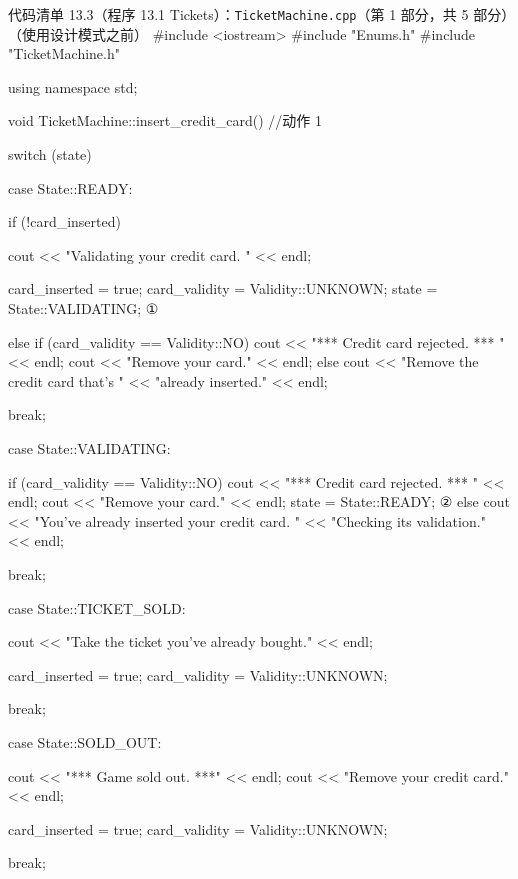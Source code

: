 \begin{codeboxt}{代码清单 13.3（程序 13.1 Tickets）：\texttt{Ticket\allowbreak{}Machine.\allowbreak{}cpp}（第 1 部分，共 5 部分）（使用设计模式之前）}
#include <iostream>
#include "Enums.h"
#include "TicketMachine.h"

using namespace std;

void TicketMachine::insert_credit_card()  //动作 1
{
    switch (state)
    {
        case State::READY:
        {
            if (!card_inserted)
            {
                cout << "Validating your credit card. " << endl;

                card_inserted = true;
                card_validity = Validity::UNKNOWN;
                state = State::VALIDATING;               ①
            }
            else if (card_validity == Validity::NO)
            {
                cout << "*** Credit card rejected. *** " << endl;
                cout << "Remove your card." << endl;
            }
            else
            {
                cout << "Remove the credit card that’s "
                     << "already inserted." << endl;
            }

            break;
        }

        case State::VALIDATING:
        {
            if (card_validity == Validity::NO)
            {
                cout << "*** Credit card rejected. *** " << endl;
                cout << "Remove your card." << endl;
                state = State::READY;                         ②
            }
            else
            {
                cout << "You’ve already inserted your credit card. "
                     << "Checking its validation." << endl;
            }

            break;
        }

        case State::TICKET_SOLD:
        {
            cout << "Take the ticket you’ve already bought."
                 << endl;

            card_inserted = true;
            card_validity = Validity::UNKNOWN;

            break;
        }

        case State::SOLD_OUT:
        {
            cout << "*** Game sold out. ***" << endl;
            cout << "Remove your credit card." << endl;

            card_inserted = true;
            card_validity = Validity::UNKNOWN;

            break;
        }
    }
}
\end{codeboxt}
\par
{}\par

